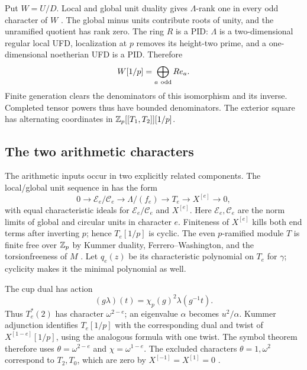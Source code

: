 Put $W=U/D$. Local and global unit duality gives $\Lambda$-rank
one in every odd character of $W$
\cite[Proposition~2.2.6 and its proof, pp.~3--4]{WWEOrd}.
The global minus units contribute roots of unity, and the
unramified quotient has rank zero. The ring $R$ is a PID:
$\Lambda$ is a two-dimensional regular local UFD, localization
at $p$ removes its height-two prime, and a one-dimensional
noetherian UFD is a PID. Therefore
\begin{equation}
                  W[1/p]=\bigoplus_{a\ {\rm odd}}Re_a .
                  \label{eq:Wfree}
\end{equation}
Finite generation clears the denominators of this isomorphism
and its inverse. Completed tensor powers thus have bounded
denominators. The exterior square has alternating coordinates
in $\mathbb Z_p[[T_1,T_2]][1/p]$.

\subsection{The two arithmetic characters}

The arithmetic inputs occur in two explicitly related components.
The local/global unit sequence in
\cite[Corollary~2.1.3, p.~8]{WWEPseudo} has the form
\begin{equation}
 0\longrightarrow\mathcal E_e/\mathcal C_e
 \longrightarrow\Lambda/(f_e)\longrightarrow T_e
 \longrightarrow X^{[e]}\longrightarrow0 ,
 \label{eq:unitseq}
\end{equation}
with equal characteristic ideals for $\mathcal E_e/\mathcal C_e$
and $X^{[e]}$. Here $\mathcal E_e,\mathcal C_e$ are the norm limits
of global and circular units in character $e$.
Finiteness of $X^{[e]}$ kills both end terms after inverting $p$;
hence $T_e[1/p]$ is cyclic.
The even $p$-ramified module $T$ is finite free over $\mathbb Z_p$ by
Kummer duality, Ferrero--Washington, and the torsionfreeness of $M$
\cite[Proposition~3.4.7 and Corollary~3.4.8, p.~92]{SharifiIwa}.
Let $q_e(z)$ be its characteristic polynomial on $T_e$ for
$\gamma$; cyclicity makes it the minimal polynomial as well.

The cup dual has action
\begin{equation}
 (g\lambda)(t)=\chi_p(g)^2\lambda(g^{-1}t).
 \label{eq:twodual}
\end{equation}
Thus $T_e^*(2)$ has character $\omega^{2-e}$; an eigenvalue
$\alpha$ becomes $u^2/\alpha$. Kummer adjunction identifies
$T_e[1/p]$ with the corresponding dual and twist of
$X^{[1-e]}[1/p]$, using the analogous formula with one twist.
The symbol theorem therefore uses
$\theta=\omega^{2-e}$ and $\chi=\omega^{1-e}$.
The excluded characters $\theta=1,\omega^2$ correspond to
$T_2,T_0$, which are zero by $X^{[-1]}=X^{[1]}=0$
\cite[proof of Lemma~5.2.7, p.~13]{WWEOrd}.

